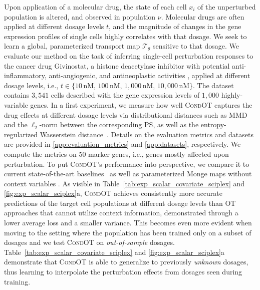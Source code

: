  Upon application of a molecular drug, the state of each cell $x_i$ of the unperturbed population is altered, and observed in population $\nu$.
Molecular drugs are often applied at different dosage levels $t$, and the magnitude of changes in the gene expression profiles of single cells highly correlates with that dosage. 
We seek to learn a global, parameterized transport map $\mathcal{T}_\theta$ sensitive to that dosage.%
We evaluate our method on the task of inferring single-cell perturbation responses to the cancer drug Givinostat, a histone deacetylase inhibitor with potential anti-inflammatory, anti-angiogenic, and antineoplastic activities \citep{srivatsan2020massively}, applied at different dosage levels, i.e., $t \in \{10\,$nM, $100\,$nM, $1,000\,$nM, $10,000\,$nM$\}$. The dataset contains $3,541$ cells described with the gene expression levels of $1,000$ highly-variable genes.
In a first experiment, we measure how well \textsc{CondOT} captures the drug effects at different dosage levels via distributional distances such as MMD~\citep{gretton2012kernel} and the $\ell_2$-norm between the corresponding \acrfull{PS}, as well as the entropy-regularized Wasserstein distance~\citep{cuturi2013sinkhorn}. Details on the evaluation metrics and datasets are provided in \cref{app:evaluation_metrics} and \cref{app:datasets}, respectively. 
We compute the metrics on 50 marker genes, i.e., genes mostly affected upon perturbation.
To put \textsc{CondOT}'s performance into perspective, we compare it to current state-of-the-art baselines~\citep{lotfollahi2021compositional} as well as parameterized Monge maps without context variables \citep[\textsc{ICNN OT}]{bunne2021learning, makkuva2020optimal}.
As visible in Table~\ref{tab:exp_scalar_covariate_sciplex} and \cref{fig:exp_scalar_sciplex}a, \textsc{CondOT} achieves consistently more accurate predictions of the target cell populations at different dosage levels than OT approaches that cannot utilize context information, demonstrated through a lower average loss and a smaller variance.
This becomes even more evident when moving to the setting where the population has been trained only on a subset of dosages and we test \textsc{CondOT} on \emph{out-of-sample} dosages. Table~\ref{tab:exp_scalar_covariate_sciplex} and \cref{fig:exp_scalar_sciplex}a demonstrate that \textsc{CondOT} is able to generalize to previously \emph{unknown} dosages, thus learning to interpolate the perturbation effects from dosages seen during training.
